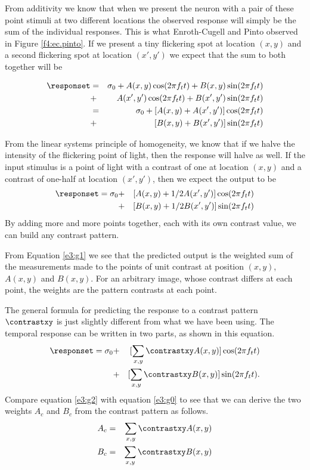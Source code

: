 From additivity we know that when we present
the neuron with a pair of these point stimuli at two different
locations the observed response will simply be the sum
of the individual responses.
This is what
Enroth-Cugell and Pinto observed in Figure \ref{f4:ec.pinto}.
If we present a tiny flickering spot at location $(x,y)$
and a second flickering spot at location $(x' , y')$ we expect that
the sum to both together will be

\begin{eqnarray}
\responset  & = & 
   \sigma_{0} + A(x,y) \cos ( 2 \pi f_t t ) + B(x,y) \sin ( 2 \pi f_t t ) \nonumber \\
& + & A(x',y') \cos ( 2 \pi f_t t ) + B(x',y') \sin ( 2 \pi f_t t) \nonumber \\
& = &  \sigma_{0} + [ A(x,y) + A(x',y') ] \cos ( 2 \pi f_t t)  \nonumber \\
& + & [ B(x,y) + B(x',y') ] \sin ( 2 \pi f_t t)
\end{eqnarray}

From the linear systems principle of homogeneity,
we know that
if we halve the intensity of the flickering point of light,
then the response will halve as well.
If the input stimulus is a point of light
with a contrast of one at location $(x,y)$ and a contrast
of one-half at location $(x',y')$, then we expect the output
to be
\begin{eqnarray}
\label{e3:g1}
\responset
  = \sigma_{0} & + & [ A(x,y) + { 1 / 2 } A(x',y') ] \cos ( 2 \pi f_t t) \nonumber \\
  & + & [ B(x,y) + { 1 / 2 } B(x',y') ] \sin ( 2 \pi f_t t)
\end{eqnarray}
By adding more and more points together, each with its own contrast
value, we can build any contrast pattern.

From Equation \ref{e3:g1} we see that
the predicted output
is the weighted sum of the measurements made to
the points of unit contrast at position $(x,y)$,
$A(x,y)$ and $B(x,y)$.
For an arbitrary image, whose contrast differs at each point,
the weights are the pattern contrasts at each point.

The general formula for predicting the response to a
contrast pattern $\contrastxy$ is just slightly
different from what we have been using.
The temporal response can be written in two parts,
as shown in this equation.
\begin{eqnarray}
\label{e3:g2}
\responset 
   = \sigma_{0} & + & [\sum_{x,y} \contrastxy A (x,y) ] \cos ( 2 \pi f_t t ) \nonumber \\
   & + & [\sum_{x,y} \contrastxy B (x,y) ] \sin ( 2 \pi f_t t ) .
\end{eqnarray}
Compare equation \ref{e3:g2} with equation \ref{e3:g0} to see that
we can derive the two weights $A_{c}$ and $B_{c}$ from
the contrast pattern as follows.
\begin{eqnarray}
\label{e3:g3}
A_{c} & = &\sum_{x,y} \contrastxy A (x,y) \nonumber \\
B_{c} & = &\sum_{x,y} \contrastxy B (x,y)
\end{eqnarray}

